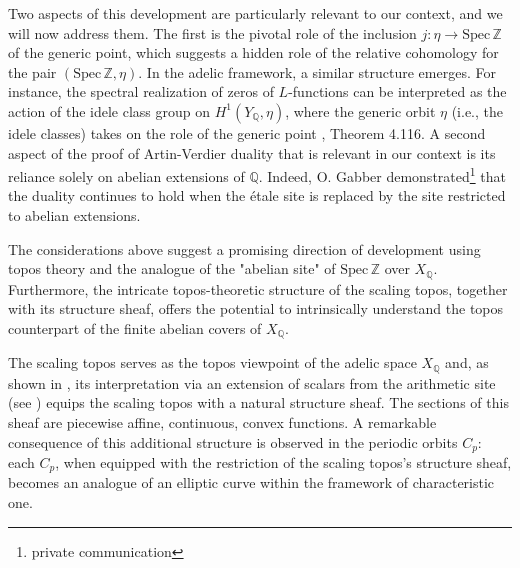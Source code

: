 \documentclass[letterpaper,11pt]{article}
\theoremstyle{plain}
\begin{document}
 Two aspects of this development are particularly relevant to our context, and we will now address them. The first is the pivotal role of the inclusion $j: \eta \to \text{Spec} \, \mathbb{Z}$ of the generic point, which suggests a hidden role of the  relative cohomology for the pair $ (\text{Spec} \, \mathbb{Z}, \eta)$.  In the adelic framework, a similar structure emerges. For instance, the spectral realization of zeros of $L$-functions can be interpreted as the action of the idele class group on $ H^1(Y_\mathbb{Q}, \eta) $, where the generic orbit $ \eta $ (i.e., the idele classes) takes on the role of the generic point \cite{CM}, Theorem 4.116.  
A second aspect of the proof of Artin-Verdier duality that is relevant in our context is its reliance solely on abelian extensions of $ \mathbb{Q} $. Indeed, O. Gabber demonstrated\footnote{private communication} that the duality continues to hold when the \'etale site is replaced by the site restricted to abelian extensions. 

The considerations above suggest a promising direction of development using topos theory and the analogue of the "abelian  site" of $ \text{Spec} \, \mathbb{Z} $ over $ X_\mathbb{Q} $. Furthermore, the intricate topos-theoretic structure of the scaling topos, together with its structure sheaf, offers the potential to intrinsically understand the topos counterpart of the finite abelian covers of $ X_\mathbb{Q} $.  

The scaling topos serves as the topos viewpoint of the adelic space $ X_\mathbb{Q} $ and, as shown in \cite{CC4}, its interpretation via an extension of scalars from the arithmetic site (see \cite{CC3}) equips the scaling topos with a natural structure sheaf. The sections of this sheaf are piecewise affine, continuous, convex functions. A remarkable consequence of this additional structure is observed in the periodic orbits $ C_p $: each $ C_p $, when equipped with the restriction of the scaling topos’s structure sheaf, becomes an analogue of an elliptic curve within the framework of characteristic one.\vspace{.02in}
 
 
\end{document}
